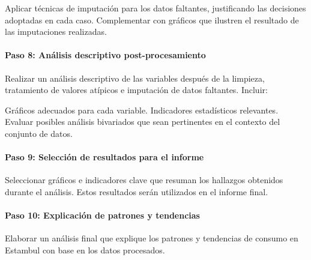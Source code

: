 \documentclass[
]{article}
\begin{document}
Aplicar técnicas de imputación para los datos faltantes, justificando
las decisiones adoptadas en cada caso. Complementar con gráficos que
ilustren el resultado de las imputaciones realizadas.

\paragraph{Paso 8: Análisis descriptivo
post-procesamiento}\label{paso-8-anuxe1lisis-descriptivo-post-procesamiento}

Realizar un análisis descriptivo de las variables después de la
limpieza, tratamiento de valores atípicos e imputación de datos
faltantes. Incluir:

Gráficos adecuados para cada variable. Indicadores estadísticos
relevantes. Evaluar posibles análisis bivariados que sean pertinentes en
el contexto del conjunto de datos.

\paragraph{Paso 9: Selección de resultados para el
informe}\label{paso-9-selecciuxf3n-de-resultados-para-el-informe}

Seleccionar gráficos e indicadores clave que resuman los hallazgos
obtenidos durante el análisis. Estos resultados serán utilizados en el
informe final.

\paragraph{Paso 10: Explicación de patrones y
tendencias}\label{paso-10-explicaciuxf3n-de-patrones-y-tendencias}

Elaborar un análisis final que explique los patrones y tendencias de
consumo en Estambul con base en los datos procesados.
\end{document}
